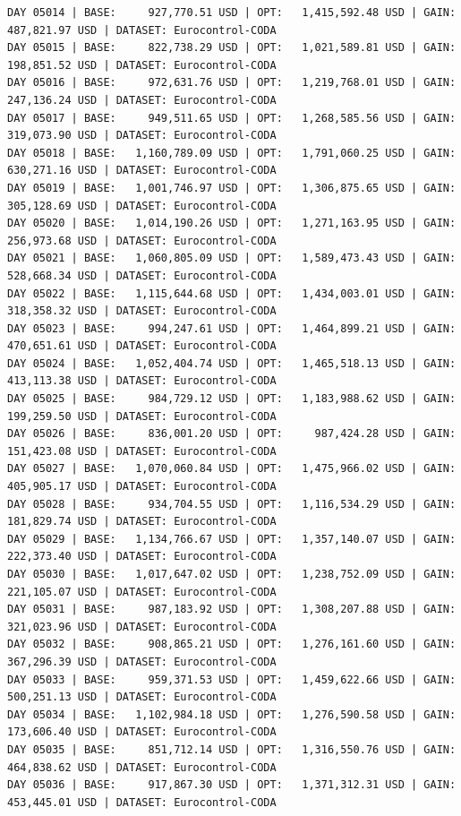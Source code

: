 \documentclass[11pt,a4paper]{article}
\begin{document}
\begin{verbatim}
DAY 05014 | BASE:     927,770.51 USD | OPT:   1,415,592.48 USD | GAIN: 487,821.97 USD | DATASET: Eurocontrol-CODA
DAY 05015 | BASE:     822,738.29 USD | OPT:   1,021,589.81 USD | GAIN: 198,851.52 USD | DATASET: Eurocontrol-CODA
DAY 05016 | BASE:     972,631.76 USD | OPT:   1,219,768.01 USD | GAIN: 247,136.24 USD | DATASET: Eurocontrol-CODA
DAY 05017 | BASE:     949,511.65 USD | OPT:   1,268,585.56 USD | GAIN: 319,073.90 USD | DATASET: Eurocontrol-CODA
DAY 05018 | BASE:   1,160,789.09 USD | OPT:   1,791,060.25 USD | GAIN: 630,271.16 USD | DATASET: Eurocontrol-CODA
DAY 05019 | BASE:   1,001,746.97 USD | OPT:   1,306,875.65 USD | GAIN: 305,128.69 USD | DATASET: Eurocontrol-CODA
DAY 05020 | BASE:   1,014,190.26 USD | OPT:   1,271,163.95 USD | GAIN: 256,973.68 USD | DATASET: Eurocontrol-CODA
DAY 05021 | BASE:   1,060,805.09 USD | OPT:   1,589,473.43 USD | GAIN: 528,668.34 USD | DATASET: Eurocontrol-CODA
DAY 05022 | BASE:   1,115,644.68 USD | OPT:   1,434,003.01 USD | GAIN: 318,358.32 USD | DATASET: Eurocontrol-CODA
DAY 05023 | BASE:     994,247.61 USD | OPT:   1,464,899.21 USD | GAIN: 470,651.61 USD | DATASET: Eurocontrol-CODA
DAY 05024 | BASE:   1,052,404.74 USD | OPT:   1,465,518.13 USD | GAIN: 413,113.38 USD | DATASET: Eurocontrol-CODA
DAY 05025 | BASE:     984,729.12 USD | OPT:   1,183,988.62 USD | GAIN: 199,259.50 USD | DATASET: Eurocontrol-CODA
DAY 05026 | BASE:     836,001.20 USD | OPT:     987,424.28 USD | GAIN: 151,423.08 USD | DATASET: Eurocontrol-CODA
DAY 05027 | BASE:   1,070,060.84 USD | OPT:   1,475,966.02 USD | GAIN: 405,905.17 USD | DATASET: Eurocontrol-CODA
DAY 05028 | BASE:     934,704.55 USD | OPT:   1,116,534.29 USD | GAIN: 181,829.74 USD | DATASET: Eurocontrol-CODA
DAY 05029 | BASE:   1,134,766.67 USD | OPT:   1,357,140.07 USD | GAIN: 222,373.40 USD | DATASET: Eurocontrol-CODA
DAY 05030 | BASE:   1,017,647.02 USD | OPT:   1,238,752.09 USD | GAIN: 221,105.07 USD | DATASET: Eurocontrol-CODA
DAY 05031 | BASE:     987,183.92 USD | OPT:   1,308,207.88 USD | GAIN: 321,023.96 USD | DATASET: Eurocontrol-CODA
DAY 05032 | BASE:     908,865.21 USD | OPT:   1,276,161.60 USD | GAIN: 367,296.39 USD | DATASET: Eurocontrol-CODA
DAY 05033 | BASE:     959,371.53 USD | OPT:   1,459,622.66 USD | GAIN: 500,251.13 USD | DATASET: Eurocontrol-CODA
DAY 05034 | BASE:   1,102,984.18 USD | OPT:   1,276,590.58 USD | GAIN: 173,606.40 USD | DATASET: Eurocontrol-CODA
DAY 05035 | BASE:     851,712.14 USD | OPT:   1,316,550.76 USD | GAIN: 464,838.62 USD | DATASET: Eurocontrol-CODA
DAY 05036 | BASE:     917,867.30 USD | OPT:   1,371,312.31 USD | GAIN: 453,445.01 USD | DATASET: Eurocontrol-CODA

\end{verbatim}
\end{document}
